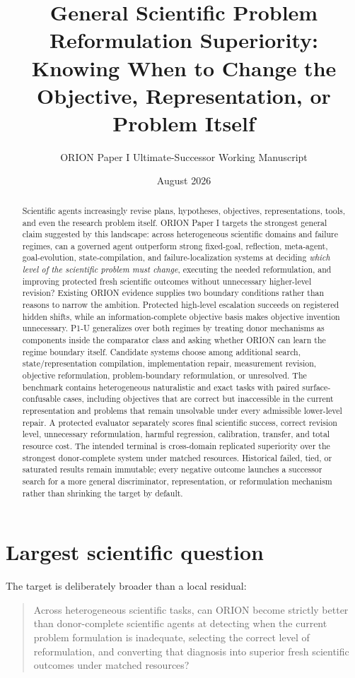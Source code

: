 \documentclass[11pt]{article}
\title{General Scientific Problem Reformulation Superiority:\\
Knowing When to Change the Objective, Representation, or Problem Itself}
\author{ORION Paper I Ultimate-Successor Working Manuscript}
\date{August 2026}
\begin{document}
\maketitle

\begin{abstract}
Scientific agents increasingly revise plans, hypotheses, objectives, representations, tools, and even the research problem itself. ORION Paper I targets the strongest general claim suggested by this landscape: across heterogeneous scientific domains and failure regimes, can a governed agent outperform strong fixed-goal, reflection, meta-agent, goal-evolution, state-compilation, and failure-localization systems at deciding \emph{which level of the scientific problem must change}, executing the needed reformulation, and improving protected fresh scientific outcomes without unnecessary higher-level revision? Existing ORION evidence supplies two boundary conditions rather than reasons to narrow the ambition. Protected high-level escalation succeeds on registered hidden shifts, while an information-complete objective basis makes objective invention unnecessary. P1-U generalizes over both regimes by treating donor mechanisms as components inside the comparator class and asking whether ORION can learn the regime boundary itself. Candidate systems choose among additional search, state/representation compilation, implementation repair, measurement revision, objective reformulation, problem-boundary reformulation, or unresolved. The benchmark contains heterogeneous naturalistic and exact tasks with paired surface-confusable cases, including objectives that are correct but inaccessible in the current representation and problems that remain unsolvable under every admissible lower-level repair. A protected evaluator separately scores final scientific success, correct revision level, unnecessary reformulation, harmful regression, calibration, transfer, and total resource cost. The intended terminal is cross-domain replicated superiority over the strongest donor-complete system under matched resources. Historical failed, tied, or saturated results remain immutable; every negative outcome launches a successor search for a more general discriminator, representation, or reformulation mechanism rather than shrinking the target by default.
\end{abstract}

\section{Largest scientific question}
The target is deliberately broader than a local residual:
\begin{quote}
Across heterogeneous scientific tasks, can ORION become strictly better than donor-complete scientific agents at detecting when the current problem formulation is inadequate, selecting the correct level of reformulation, and converting that diagnosis into superior fresh scientific outcomes under matched resources?
\end{quote}
\end{document}
